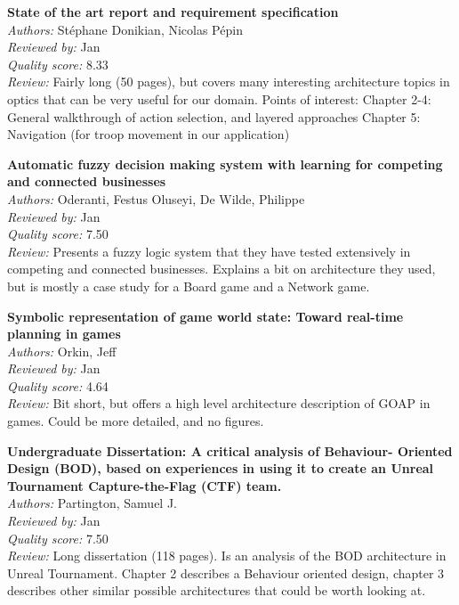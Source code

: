 {\textbf{State of the art report and requirement specification\cite{StephaneDonikian}}\\
\textit{Authors:} St\'{e}phane Donikian, Nicolas P\'{e}pin\\
\textit{Reviewed by:} Jan\\
\textit{Quality score:} 8.33\\
\textit{Review:} Fairly long (50 pages), but covers many interesting architecture topics in optics that can be very useful for our domain. Points of interest:
Chapter 2-4: General walkthrough of action selection, and layered approaches
Chapter 5: Navigation (for troop movement in our application)

\textbf{Automatic fuzzy decision making system with learning for competing and connected businesses\cite{Oderanti2011}}\\
\textit{Authors:} Oderanti, Festus Oluseyi, De Wilde, Philippe\\
\textit{Reviewed by:} Jan\\
\textit{Quality score:} 7.50\\
\textit{Review:} Presents a fuzzy logic system that they have tested extensively in competing and connected businesses. Explains a bit on architecture they used, but is mostly a case study for a Board game and a Network game.

\textbf{Symbolic representation of game world state: Toward real-time planning in games\cite{Orkin2004}}\\
\textit{Authors:} Orkin, Jeff\\
\textit{Reviewed by:} Jan\\
\textit{Quality score:} 4.64\\
\textit{Review:} Bit short, but offers a high level architecture description of GOAP in games. Could be more detailed, and no figures. 

\textbf{Undergraduate Dissertation: A critical analysis of Behaviour- Oriented Design (BOD), based on experiences in using it to create an Unreal Tournament Capture-the-Flag (CTF) team.\cite{Partington2005}}\\
\textit{Authors:} Partington, Samuel J.\\
\textit{Reviewed by:} Jan\\
\textit{Quality score:} 7.50\\
\textit{Review:} Long dissertation (118 pages). Is an analysis of the BOD architecture in Unreal Tournament. Chapter 2 describes a Behaviour oriented design, chapter 3 describes other similar possible architectures that could be worth looking at.

}

